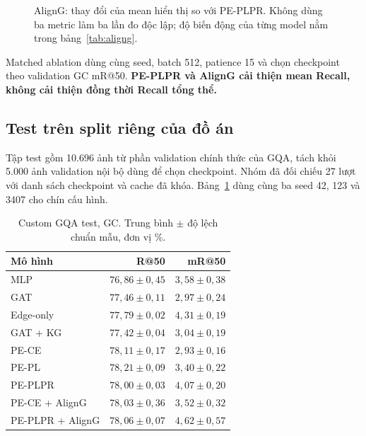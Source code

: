 \begin{figure}[!ht]\centering
{}
\caption{AlignG: thay đổi của mean hiển thị so với PE-PLPR. Không dùng ba metric
làm ba lần đo độc lập; độ biến động của từng model nằm trong bảng~\ref{tab:aligng}.}
\end{figure}

Matched ablation dùng cùng seed, batch 512, patience 15 và chọn checkpoint
theo validation GC mR@50. \textbf{PE-PLPR và AlignG cải thiện mean Recall,
không cải thiện đồng thời Recall tổng thể.}

\subsection{Test trên split riêng của đồ án}
Tập test gồm 10.696 ảnh từ phần validation chính thức của GQA, tách khỏi
5.000 ảnh validation nội bộ dùng để chọn checkpoint. Nhóm đã đối chiếu
27 lượt với danh sách checkpoint và cache đã khóa. Bảng~\ref{tab:gqatest}
dùng cùng ba seed 42, 123 và 3407 cho chín cấu hình.
\begin{table}[!ht]\centering\small
\caption{Custom GQA test, GC. Trung bình $\pm$ độ lệch chuẩn mẫu, đơn vị \%.}\label{tab:gqatest}
\begin{tabular}{@{}lrr@{}}\toprule
Mô hình & R@50 & mR@50\\\midrule
MLP & $76,86\pm0,45$ & $3,58\pm0,38$\\
GAT & $77,46\pm0,11$ & $2,97\pm0,24$\\
Edge-only & $77,79\pm0,02$ & $4,31\pm0,19$\\
GAT + KG & $77,42\pm0,04$ & $3,04\pm0,19$\\
PE-CE & $78,11\pm0,17$ & $2,93\pm0,16$\\
PE-PL & $78,21\pm0,09$ & $3,40\pm0,22$\\
PE-PLPR & $78,00\pm0,03$ & $4,07\pm0,20$\\
PE-CE + AlignG & $78,03\pm0,36$ & $3,52\pm0,32$\\
PE-PLPR + AlignG & $78,06\pm0,07$ & $4,62\pm0,57$\\
\bottomrule\end{tabular}\end{table}
